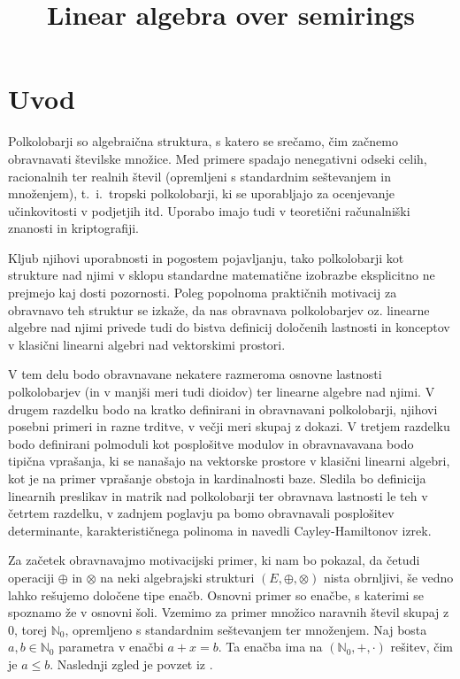 \documentclass[mat1]{fmfdelo}
\title{Linear algebra over semirings}
\newcommand{\N}{\mathbb{N}}
\newcommand{\No}{\N_0}
\begin{document}

\tableofcontents

\section{Uvod}\label{sect:intro}
Polkolobarji so algebraična struktura, s katero se srečamo, čim začnemo obravnavati številske množice. Med primere spadajo nenegativni odseki celih, racionalnih ter realnih števil (opremljeni s standardnim seštevanjem in množenjem), t.~i.~tropski polkolobarji, ki se uporabljajo za ocenjevanje učinkovitosti v podjetjih itd. Uporabo imajo tudi v teoretični računalniški znanosti in kriptografiji. 

Kljub njihovi uporabnosti in pogostem pojavljanju, tako polkolobarji kot strukture nad njimi v sklopu standardne matematične izobrazbe eksplicitno ne prejmejo kaj dosti pozornosti. Poleg popolnoma praktičnih motivacij za obravnavo teh struktur se izkaže, da nas obravnava polkolobarjev oz. linearne algebre nad njimi privede tudi do bistva definicij določenih lastnosti in konceptov v klasični linearni algebri nad vektorskimi prostori. 

V tem delu bodo obravnavane nekatere razmeroma osnovne lastnosti polkolobarjev (in v manjši meri tudi dioidov) ter linearne algebre nad njimi. V drugem razdelku bodo na kratko definirani in obravnavani polkolobarji, njihovi posebni primeri in razne trditve, v večji meri skupaj z dokazi. V tretjem razdelku bodo definirani polmoduli kot posplošitve modulov in obravnavavana bodo tipična vprašanja, ki se nanašajo na vektorske prostore v klasični linearni algebri, kot je na primer vprašanje obstoja in kardinalnosti baze. Sledila bo definicija linearnih preslikav in matrik nad polkolobarji ter obravnava lastnosti le teh v četrtem razdelku, v zadnjem poglavju pa bomo obravnavali posplošitev determinante, karakterističnega polinoma in navedli Cayley-Hamiltonov izrek.

Za začetek obravnavajmo motivacijski primer, ki nam bo pokazal, da četudi operaciji $\oplus$ in $\otimes$ na neki algebrajski strukturi $(E, \oplus, \otimes)$ nista obrnljivi, še vedno lahko rešujemo določene tipe enačb. Osnovni primer so enačbe, s katerimi se spoznamo že v osnovni šoli. Vzemimo za primer množico naravnih števil skupaj z $0$, torej $\No$, opremljeno s standardnim seštevanjem ter množenjem. Naj bosta $a, b\in \No$ parametra v enačbi $a + x = b$. Ta enačba ima na $(\No, +, \cdot)$ rešitev, čim je $a \leq b$. Naslednji zgled je povzet iz \cite[str. 1 -- 2]{bib:Gondran}.
\end{document}
